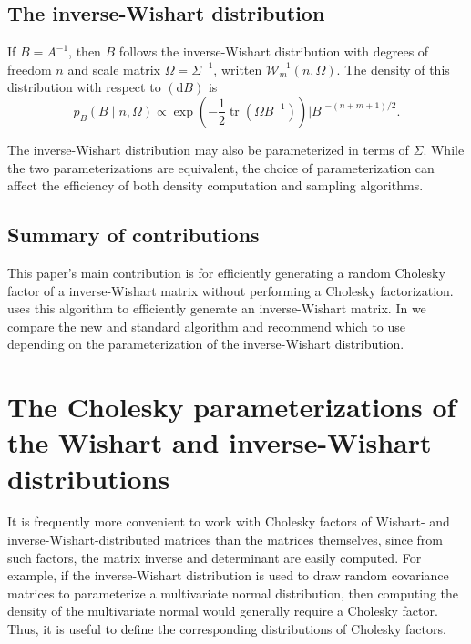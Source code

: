 \documentclass[12pt,a4paper,reqno]{amsart}
\numberwithin{equation}{section}
\newcommand{\invwishart}[1]{\mathcal{W}^{-1}_{#1}}
\renewcommand{\det}[1]{\left| {#1} \right|}
\newcommand{\dmeasure}[1]{\left(\dd{#1}\right)}
\newcommand{\dd}[1]{\mathrm{d}{#1}}
\newcommand{\tr}{\operatorname{tr}}
\begin{document}
\subsection*{The inverse-Wishart distribution}

If $B=A^{-1}$, then $B$ follows the inverse-Wishart distribution with degrees of freedom $n$ and scale matrix $\Omega = \Sigma^{-1}$, written $\invwishart{m}(n, \Omega)$.
The density of this distribution with respect to $\dmeasure{B}$ is
\begin{equation}\label{invwishartdensity}
    p_B(B \mid n, \Omega) \propto \exp\left(-\frac{1}{2}\tr(\Omega B^{-1})\right) \det{B}^{-(n+m+1)/2}.
\end{equation}

The inverse-Wishart distribution may also be parameterized in terms of $\Sigma$.
While the two parameterizations are equivalent, the choice of parameterization can affect the efficiency of both density computation and sampling algorithms.

\subsection*{Summary of contributions}

This paper's main contribution is  for efficiently generating a random Cholesky factor of a inverse-Wishart matrix without performing a Cholesky factorization.
 uses this algorithm to efficiently generate an inverse-Wishart matrix.
In  we compare the new and standard algorithm and recommend which to use depending on the parameterization of the inverse-Wishart distribution.

\section{The Cholesky parameterizations of the Wishart and inverse-Wishart distributions}

It is frequently more convenient to work with Cholesky factors of Wishart- and inverse-Wishart-distributed matrices than the matrices themselves, since from such factors, the matrix inverse and determinant are easily computed.
For example, if the inverse-Wishart distribution is used to draw random covariance matrices to parameterize a multivariate normal distribution, then computing the density of the multivariate normal would generally require a Cholesky factor.
Thus, it is useful to define the corresponding distributions of Cholesky factors.
\end{document}
